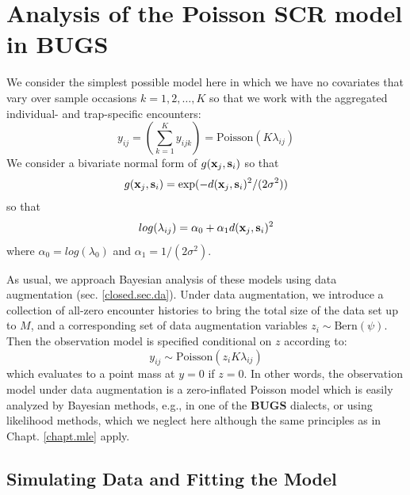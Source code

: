 \section{Analysis of the Poisson SCR model in BUGS}

We consider the simplest possible model here in which we have no
covariates that vary over sample occasions  $k=1,2,\ldots,K$ 
so that we work with
the aggregated individual- and trap-specific encounters:
\[
y_{ij} = (\sum_{k=1}^{K} y_{ijk}) =  \mbox{Poisson}(K  \lambda_{ij})
\]
We consider a bivariate normal form of $g({\bf x}_{j},{\bf s}_{i})$ so
that
\[
g({\bf x}_{j},{\bf s}_{i}) = \exp( -d({\bf x}_{j}, {\bf
  s}_{i})^{2} /(2\sigma^{2}))
\]
so that 
\[
log( \lambda_{ij})  =\alpha_{0} + \alpha_{1} d({\bf x}_{j}, {\bf s}_{i})^2
\]
where $\alpha_{0} = log(\lambda_{0})$ and $\alpha_1 = 1/(2\sigma^2)$.


As usual, we approach Bayesian analysis of these
models using data augmentation (sec. \ref{closed.sec.da}).
Under data augmentation, we introduce a collection of all-zero encounter
histories to bring the total size of the data set up to $M$, and a corresponding
set of data augmentation variables $z_{i} \sim \mbox{Bern}(\psi)$. Then
the observation model is specified conditional on $z$ according to:
\[
y_{ij} \sim  \mbox{Poisson}(z_{i} K  \lambda_{ij})
\]
which evaluates to a point mass at $y=0$ if $z=0$.  In other words, the
observation model under data augmentation is a zero-inflated Poisson
model which is easily analyzed by Bayesian methods, e.g., in one of
the {\bf BUGS}
dialects, or  using likelihood methods, which we neglect here although
the same principles as in Chapt. \ref{chapt.mle} apply.


\subsection{Simulating Data and Fitting the Model}


